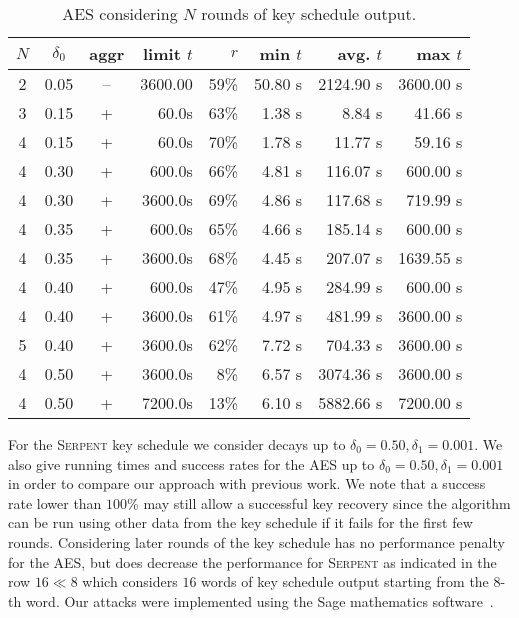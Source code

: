 \documentclass{llncs}
\newcommand{\Serpent}{\textsc{Serpent}\xspace}
\begin{document}
\begin{table}[htbp]
\begin{center}
\begin{tabular}{|c|c|c|r|r|r|r|r|}
\hline
$N$ & $\delta_0$ & aggr & limit $t$ & $r$ & min $t$ & avg. $t$ & max $t$\\
\hline
2 & 0.05 & -- & 3600.00 &  59\% & 50.80 s & 2124.90 s & 3600.00 s\\ %
\hline
3 & 0.15 & + &    60.0s &  63\% & 1.38 s &   8.84 s &   41.66 s\\ %
4 & 0.15 & + &    60.0s &  70\% & 1.78 s &  11.77 s &   59.16 s\\ %
\hline
4 & 0.30 & + &   600.0s &  66\% & 4.81 s & 116.07 s &  600.00 s\\ %
4 & 0.30 & + &  3600.0s &  69\% & 4.86 s & 117.68 s &  719.99 s\\ %
\hline
4 & 0.35 & + &   600.0s &  65\% & 4.66 s & 185.14 s &  600.00 s\\ %
4 & 0.35 & + &  3600.0s &  68\% & 4.45 s & 207.07 s & 1639.55 s\\ %
\hline
4 & 0.40 & + &   600.0s &  47\% & 4.95 s & 284.99 s &  600.00 s\\ %
4 & 0.40 & + &  3600.0s &  61\% & 4.97 s & 481.99 s & 3600.00 s\\ %
\hline
5 & 0.40 & + &  3600.0s &  62\% & 7.72 s & 704.33 s & 3600.00 s\\ %
\hline
4 & 0.50 & + &  3600.0s &   8\% & 6.57 s & 3074.36 s & 3600.00 s\\ %
4 & 0.50 & + &  7200.0s &  13\% & 6.10 s & 5882.66 s & 7200.00 s\\ %
\hline
\end{tabular}
\end{center}
\caption{AES considering $N$ rounds of key schedule output.}
\label{tab:aes}
\end{table}

For the \Serpent key schedule we consider decays up to $\delta_0=0.50,\delta_1=0.001$. We also give running times and success rates for the AES up to $\delta_0 = 0.50,\delta_1=0.001$ in order to compare our approach with previous work. We note that a success rate lower than $100\%$ may still allow a successful key recovery since the algorithm can be run using other data from the key schedule if it fails for the first few rounds. Considering later rounds of the key schedule has no performance penalty for the AES, but does decrease the performance for \Serpent as indicated in the row $16 \ll 8$ which considers $16$ words of key schedule output starting from the $8$-th word.
Our attacks were implemented using the Sage mathematics software~\cite{sage}.
\end{document}
